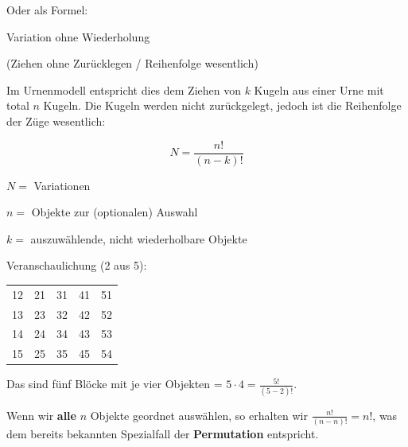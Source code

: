 
Oder als Formel:
\begin{gesetz}{Variation ohne Wiederholung}{}

  (Ziehen ohne Zurücklegen / Reihenfolge wesentlich)


Im Urnenmodell entspricht dies dem Ziehen von $k$ Kugeln aus einer
Urne mit total $n$ Kugeln. Die Kugeln werden nicht zurückgelegt,
jedoch ist die Reihenfolge der Züge wesentlich:

$$N =\frac{n!}{(n-k)!}$$

$N = $ Variationen

$n = $ Objekte zur (optionalen) Auswahl

$k = $ auszuwählende, nicht wiederholbare Objekte

\end{gesetz}

Veranschaulichung (2 aus 5):

\begin{tabular}{c|c|c|c|c}
12 & 21 & 31 & 41 & 51\\
13 & 23 & 32 & 42 & 52\\
14 & 24 & 34 & 43 & 53\\
15 & 25 & 35 & 45 & 54\\
\end{tabular}

Das sind fünf Blöcke mit je vier Objekten = $5\cdot{}4 = \frac{5!}{(5-2)!}$.
\newpage

\begin{bemerkung}{}{}
Wenn wir \textbf{alle} $n$ Objekte geordnet auswählen, so erhalten wir
$\frac{n!}{(n-n)!} = n!$, was dem bereits bekannten Spezialfall der \textbf{Permutation}
entspricht.
\end{bemerkung}




